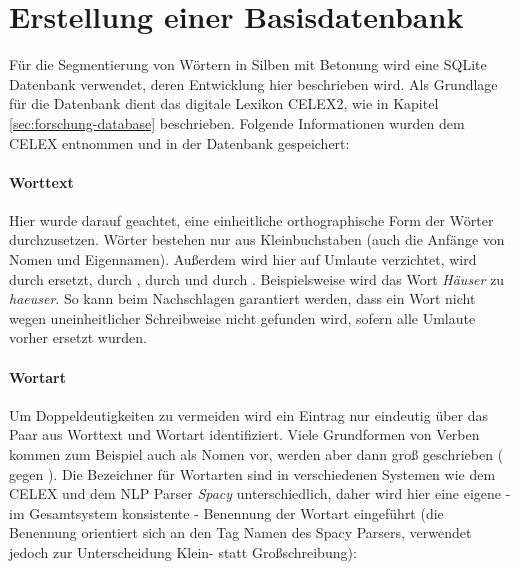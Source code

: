\section{Erstellung einer Basisdatenbank}
\label{sec:worddatabase}

Für die Segmentierung von Wörtern in Silben mit Betonung wird eine SQLite Datenbank verwendet, deren Entwicklung hier beschrieben wird. Als Grundlage für die Datenbank dient das digitale Lexikon CELEX2, wie in Kapitel \ref{sec:forschung-database} beschrieben. Folgende Informationen wurden dem CELEX entnommen und in der Datenbank gespeichert:

\paragraph{Worttext}
Hier wurde darauf geachtet, eine einheitliche orthographische Form der Wörter durchzusetzen. Wörter bestehen nur aus Kleinbuchstaben (auch die Anfänge von Nomen und Eigennamen). Außerdem wird hier auf Umlaute verzichtet,  wird durch  ersetzt,  durch ,  durch  und  durch . Beispielsweise wird das Wort \textit{Häuser} zu \textit{haeuser}. So kann beim Nachschlagen garantiert werden, dass ein Wort nicht wegen uneinheitlicher Schreibweise nicht gefunden wird, sofern alle Umlaute vorher ersetzt wurden.

\paragraph{Wortart}
Um Doppeldeutigkeiten zu vermeiden wird ein Eintrag nur eindeutig über das Paar aus Worttext und Wortart identifiziert. Viele Grundformen von Verben kommen zum Beispiel auch als Nomen vor, werden aber dann groß geschrieben ( gegen ). Die Bezeichner für Wortarten sind in verschiedenen Systemen wie dem CELEX und dem NLP Parser \textit{Spacy} unterschiedlich, daher wird hier eine eigene - im Gesamtsystem konsistente - Benennung der Wortart eingeführt (die Benennung orientiert sich an den Tag Namen des Spacy Parsers, verwendet jedoch zur Unterscheidung Klein- statt Großschreibung):

